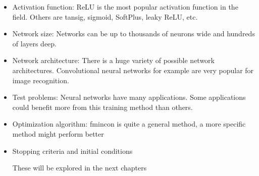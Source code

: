 \begin{itemize}
\item Activation function: ReLU is the most popular activation function in the field. Others are tansig, sigmoid, SoftPlus, leaky ReLU, etc.
\item Network size: Networks can be up to thousands of neurons wide and hundreds of layers deep. 
\item Network architecture: There is a huge variety of possible network architectures. Convolutional neural networks for example are very popular for image recognition.
\item Test problems: Neural networks have many applications. Some applications could benefit more from this training method than others.
\item Optimization algorithm: fmincon is quite a general method, a more specific method might perform better
\item Stopping criteria and initial conditions

These will be explored in the next chapters

\end{itemize}




